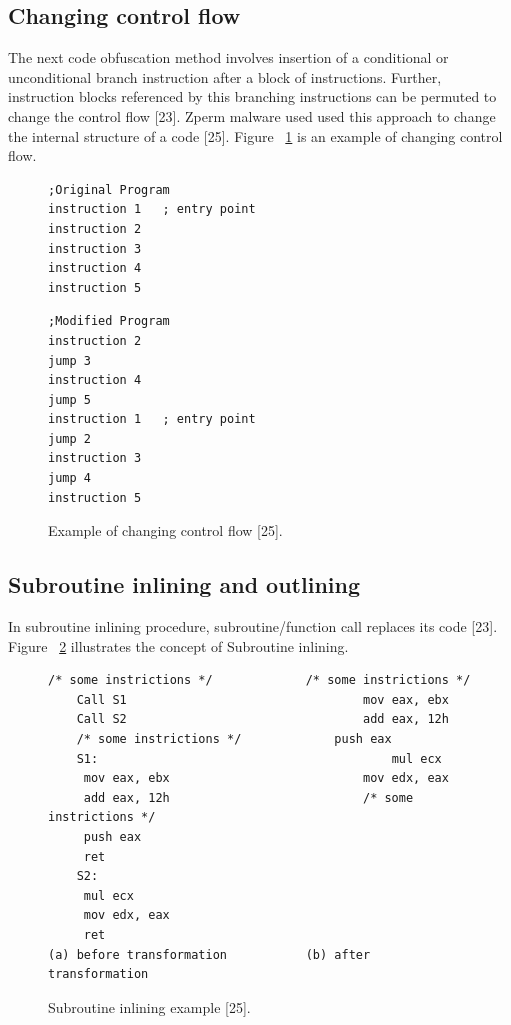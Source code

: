 \subsection{Changing control flow} 
The next code obfuscation method involves insertion of a conditional or unconditional branch instruction after a block of instructions. Further, instruction blocks referenced by this branching instructions can be permuted to change the control flow [23]. Zperm malware used used this approach to change the internal structure of a code [25]. Figure ~\ref{fig:changecntflow} is an example of changing control flow.

\begin{figure}
  \centering
  \begin{lstlisting}[language=myasm]
;Original Program 
instruction 1   ; entry point
instruction 2
instruction 3
instruction 4
instruction 5
\end{lstlisting}

\begin{lstlisting}[language=myasm]
;Modified Program
instruction 2
jump 3
instruction 4
jump 5
instruction 1   ; entry point
jump 2
instruction 3
jump 4
instruction 5
\end{lstlisting}

    \caption[Example of changing control flow]{Example of changing control flow [25].}
    \label{fig:changecntflow}
\end{figure}

\subsection{Subroutine inlining and outlining} 
In subroutine inlining procedure, subroutine/function call replaces its code [23]. Figure ~\ref{fig:subroutineinline} illustrates the concept of Subroutine inlining. 

\begin{figure}
  \centering
  \begin{lstlisting}[language=myasm]
	/* some instrictions */				/* some instrictions */ 
	Call S1									mov eax, ebx
	Call S2									add eax, 12h
	/* some instrictions */				push eax
	S1: 										mul ecx
	 mov eax, ebx							mov edx, eax
	 add eax, 12h							/* some instrictions */
	 push eax					
	 ret						
	S2:							
	 mul ecx
	 mov edx, eax
	 ret
(a) before transformation			(b) after transformation
\end{lstlisting}


    \caption[Subroutine inlining example]{Subroutine inlining example [25].}
    \label{fig:subroutineinline}
\end{figure}

